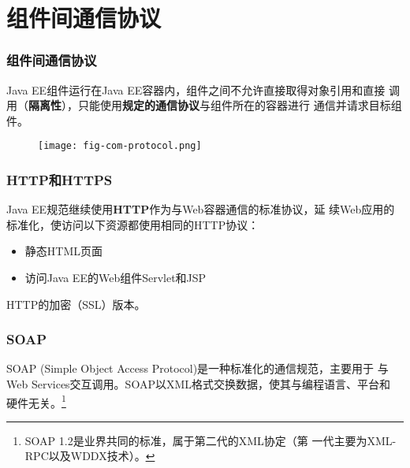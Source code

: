 \section{组件间通信协议}

\begin{frame}
  \frametitle{组件间通信协议} 

  Java EE组件运行在Java EE容器内，组件之间不允许直接取得对象引用和直接
  调用（{\bf\Red 隔离性}），只能使用{\bf\Red 规定的通信协议}与组件所在的容器进行
  通信并请求目标组件。

  \begin{figure}
    \centering
    \texttt{[image: fig-com-protocol.png]}
  \end{figure} 
\end{frame}

\begin{frame}
  \frametitle{HTTP和HTTPS} 


  Java EE规范继续使用{\bf\Red HTTP}作为与Web容器通信的标准协议，延
  续Web应用的标准化，使访问以下资源都使用相同的HTTP协议：

  \begin{itemize}\kai
  \item 静态HTML页面
  \item 访问Java EE的Web组件Servlet和JSP
  \end{itemize}


  HTTP的加密（SSL）版本。

\end{frame}


\begin{frame}
  \frametitle{SOAP} 

  SOAP (Simple Object Access Protocol)是一种标准化的通信规范，主要用于
  与Web Services交互调用。SOAP以XML格式交换数据，使其与编程语言、平台和
  硬件无关。\footnote{SOAP 1.2是业界共同的标准，属于第二代的XML协定（第
    一代主要为XML-RPC以及WDDX技术）。}
\end{frame}


